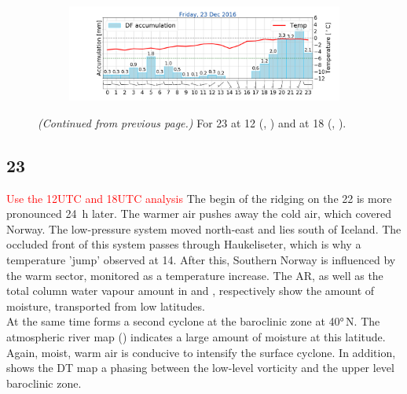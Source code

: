 \begin{figure}
\begin{subfigure}[b]{0.49\textwidth}
		\includegraphics[trim={4.9cm 1.cm 1.5cm 1cm},clip,
		width=\textwidth]{./fig_weathermast/T_P_U_20161223}
		\caption{} \label{fig:TPU23}
	\end{subfigure}
	\caption{\textit{(Continued from previous page.)} For \num{23} at \SI{12}{\UTC} (\protect{}, \protect{}) and at \SI{18}{\UTC} (\protect{}, \protect{}).}
\end{figure}
\subsection*{\SI{23}{\dec}}
\textcolor{red}{Use the 12UTC and 18UTC analysis}
\noindent The begin of the ridging on the \SI{22}{\dec} is more pronounced \SI{24}{\hour} later. The warmer air pushes away the cold air, which covered Norway.
The low-pressure system moved north-east and lies south of Iceland. The occluded front of this system passes through Haukeliseter, which is why a temperature 'jump' observed at \SI{14}{\UTC}. After this, Southern Norway is influenced by the warm sector, monitored as a temperature increase. 
The AR, as well as the total column water vapour amount in  and , respectively show the amount of moisture, transported from low latitudes.
\\
At the same time forms a second cyclone at the baroclinic zone at \ang{40}{\,N}. The atmospheric river map () indicates a large amount of moisture at this latitude. Again, moist, warm air is conducive to intensify the surface cyclone. In addition, shows the DT map a phasing between the low-level vorticity and the upper level baroclinic zone. 

